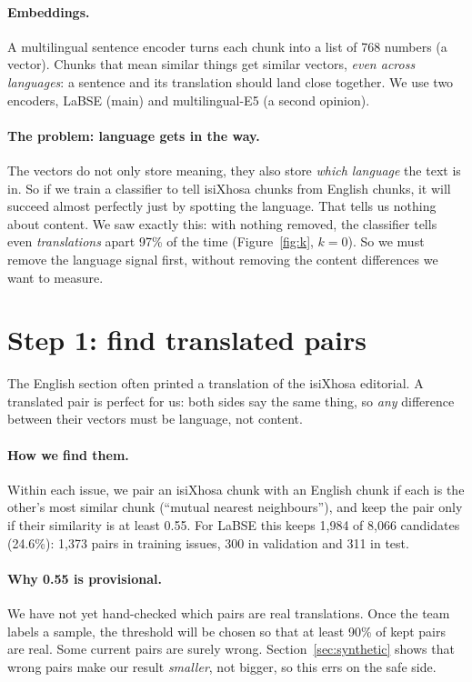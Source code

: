 \documentclass[11pt,a4paper]{article}
\begin{document}
\paragraph{Embeddings.} A multilingual sentence encoder turns each chunk into a list of 768 numbers (a
vector). Chunks that mean similar things get similar vectors, \emph{even across languages}: a sentence
and its translation should land close together. We use two encoders, LaBSE (main) and multilingual-E5
(a second opinion).

\paragraph{The problem: language gets in the way.} The vectors do not only store meaning, they also
store \emph{which language} the text is in. So if we train a classifier to tell isiXhosa chunks from
English chunks, it will succeed almost perfectly just by spotting the language. That tells us nothing
about content. We saw exactly this: with nothing removed, the classifier tells even
\emph{translations} apart 97\% of the time (Figure~\ref{fig:k}, $k{=}0$). So we must remove the language
signal first, without removing the content differences we want to measure.

\section{Step 1: find translated pairs}
The English section often printed a translation of the isiXhosa editorial. A translated pair is
perfect for us: both sides say the same thing, so \emph{any} difference between their vectors must be
language, not content.

\paragraph{How we find them.} Within each issue, we pair an isiXhosa chunk with an English chunk if
each is the other's most similar chunk (``mutual nearest neighbours''), and keep the pair only if
their similarity is at least 0.55. For LaBSE this keeps 1{,}984 of 8{,}066 candidates (24.6\%):
1{,}373 pairs in training issues, 300 in validation and 311 in test.

\paragraph{Why 0.55 is provisional.} We have not yet hand-checked which pairs are real translations.
Once the team labels a sample, the threshold will be chosen so that at least 90\% of kept pairs are real.
Some current pairs are surely wrong. Section~\ref{sec:synthetic} shows that wrong pairs make our result
\emph{smaller}, not bigger, so this errs on the safe side.
\end{document}
